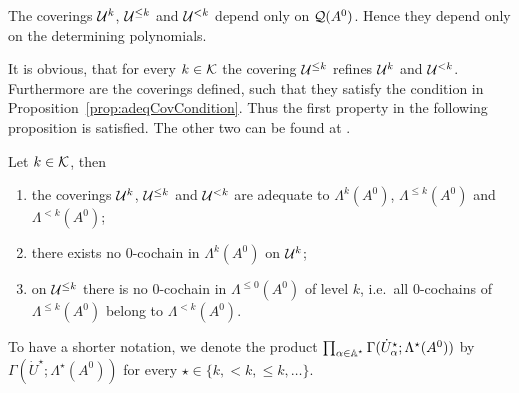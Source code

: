 \begin{rem}
  The coverings $\mathcal{U}^{k}$, $\mathcal{U}^{\leq k}$ and $\mathcal{U}^{<k}$ depend only on
  $\mathcal{Q}(A^0)$. Hence they depend only on the determining polynomials.
\end{rem}
It is obvious, that for every $k\in\mathcal{K}$ the covering $\mathcal{U}^{\leq k}$ refines
$\mathcal{U}^{k}$ and $\mathcal{U}^{<k}$.
Furthermore are the coverings defined, such that they satisfy the
condition in Proposition~\ref{prop:adeqCovCondition}.
Thus the first property in the following proposition is satisfied. The other
two can be found at \cite[Prop.II.3.1 (iv)]{Loday1994}.
\begin{prop}\label{prop:adequateProperties}
  Let $k\in\mathcal{K}$, then
  \begin{enumerate}
    \item the coverings $\mathcal{U}^{k}$, $\mathcal{U}^{\leq k}$ and $\mathcal{U}^{<k}$ are adequate
      to $\Lambda^k(A^0)$, $\Lambda^{\leq k}(A^0)$ and $\Lambda^{<k}(A^0)$;
    \item there exists no $0$-cochain in $\Lambda^k(A^0)$ on $\mathcal{U}^k$;
    \item on $\mathcal{U}^{\leq k}$ there is no $0$-cochain in $\Lambda^{\leq0}(A^0)$
      of level $k$, i.e.\ all $0$-cochains of $\Lambda^{\leq k}(A^0)$
      belong to $\Lambda^{<k}(A^0)$.
  \end{enumerate}
\end{prop}
To have a shorter notation, we denote the product
$\prod_{\alpha\in\mathbb{A}^\star}\Gamma(\dot U_\alpha^\star;\Lambda^\star(A^0))$ by
$\Gamma(\dot U^\star;\Lambda^\star(A^0))$ for every
$\star\in\{k,<k,\leq k,\dots\}$.

